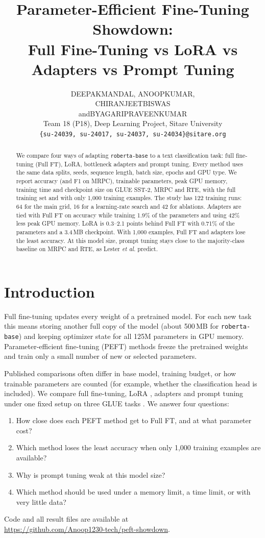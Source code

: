 \documentclass{nle}
\title[PEFT Showdown: Full FT vs LoRA vs Adapters vs Prompt Tuning]
      {Parameter-Efficient Fine-Tuning Showdown:\\
       Full Fine-Tuning vs LoRA vs Adapters vs Prompt Tuning}
\author[D. Mandal and others]
       {D\ls E\ls E\ls P\ls A\ls K\ns M\ls A\ls N\ls D\ls A\ls L,\ns
        A\ls N\ls O\ls O\ls P\ns K\ls U\ls M\ls A\ls R,\\
        C\ls H\ls I\ls R\ls A\ls N\ls J\ls E\ls E\ls T\ns B\ls I\ls S\ls W\ls A\ls S\\
        and\ns B\ls Y\ls A\ls G\ls A\ls R\ls I\ns P\ls R\ls A\ls V\ls E\ls E\ls N\ns K\ls U\ls M\ls A\ls R\\
        Team 18 (P18), Deep Learning Project, Sitare University\\
        \texttt{\{su-24039, su-24017, su-24037, su-24034\}@sitare.org}}
\begin{document}
\label{firstpage}
\maketitle

\begin{abstract}
We compare four ways of adapting \texttt{roberta-base} to a text classification task: full fine-tuning (Full FT), LoRA, bottleneck adapters and prompt tuning. Every method uses the same data splits, seeds, sequence length, batch size, epochs and GPU type. We report accuracy (and F1 on MRPC), trainable parameters, peak GPU memory, training time and checkpoint size on GLUE SST-2, MRPC and RTE, with the full training set and with only 1,000 training examples. The study has 122 training runs: 64 for the main grid, 16 for a learning-rate search and 42 for ablations. Adapters are tied with Full FT on accuracy while training 1.9\% of the parameters and using 42\% less peak GPU memory. LoRA is 0.3--2.1 points behind Full FT with 0.71\% of the parameters and a 3.4\,MB checkpoint. With 1,000 examples, Full FT and adapters lose the least accuracy. At this model size, prompt tuning stays close to the majority-class baseline on MRPC and RTE, as Lester {\it et al.}  predict.
\end{abstract}

\section{Introduction}

Full fine-tuning updates every weight of a pretrained model. For each new task this means storing another full copy of the model (about 500\,MB for \texttt{roberta-base}) and keeping optimizer state for all 125M parameters in GPU memory. Parameter-efficient fine-tuning (PEFT) methods freeze the pretrained weights and train only a small number of new or selected parameters.

Published comparisons often differ in base model, training budget, or how trainable parameters are counted (for example, whether the classification head is included). We compare full fine-tuning, LoRA \cite{hu2022}, adapters \cite{houlsby2019} and prompt tuning \cite{lester2021} under one fixed setup on three GLUE tasks \cite{wang2019}. We answer four questions:
\begin{enumerate}
  \item How close does each PEFT method get to Full FT, and at what parameter cost?
  \item Which method loses the least accuracy when only 1,000 training examples are available?
  \item Why is prompt tuning weak at this model size?
  \item Which method should be used under a memory limit, a time limit, or with very little data?
\end{enumerate}
Code and all result files are available at\\ \url{https://github.com/Anoop1230-tech/peft-showdown}.
\end{document}
